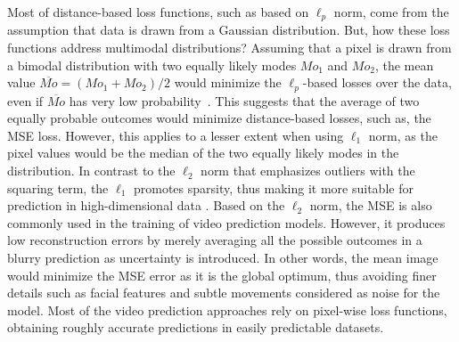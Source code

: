 Most of distance-based loss functions, such as based on $\ell_p$ norm, come from the assumption that data is drawn from a Gaussian distribution. But, how these loss functions address multimodal distributions? Assuming that a pixel is drawn from a bimodal distribution with two equally likely modes $Mo_1$ and $Mo_2$, the mean value ${\overline{Mo}=(Mo_1 + Mo_2)/2}$ would minimize the $\ell_p$-based losses over the data, even if $\overline{Mo}$ has very low probability~\cite{Mathieu2016}. This suggests that the average of two equally probable outcomes would minimize distance-based losses, such as, the \ac{MSE} loss. However, this applies to a lesser extent when using $\ell_1$ norm, as the pixel values would be the median of the two equally likely modes in the distribution. In contrast to the $\ell_2$ norm that emphasizes outliers with the squaring term, the $\ell_1$ promotes sparsity, thus making it more suitable for prediction in high-dimensional data \cite{Mathieu2016}. Based on the $\ell_2$ norm, the \ac{MSE} is also commonly used in the training of video prediction models. However, it produces low reconstruction errors by merely averaging all the possible outcomes in a blurry prediction as uncertainty is introduced. In other words, the mean image would minimize the \ac{MSE} error as it is the global optimum, thus avoiding finer details such as facial features and subtle movements considered as noise for the model. Most of the video prediction approaches rely on pixel-wise loss functions, obtaining roughly accurate predictions in easily predictable datasets.

